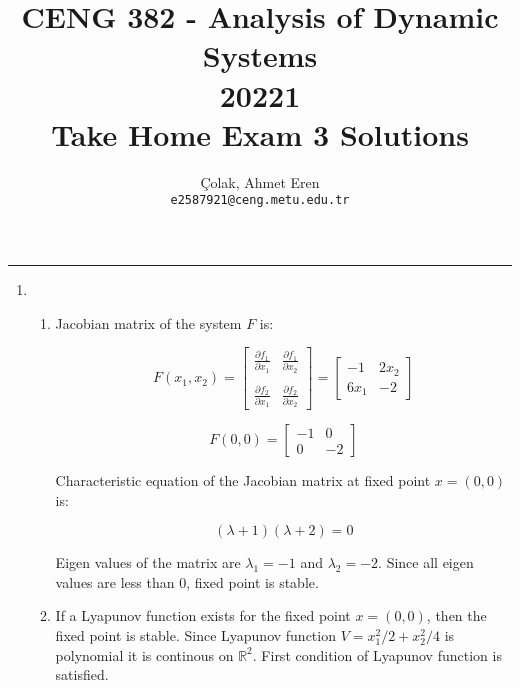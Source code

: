 \documentclass[12pt,a4paper, margin=1in]{article}
\author{
  Çolak, Ahmet Eren\\
  \texttt{e2587921@ceng.metu.edu.tr}
}
\title{CENG 382 - Analysis of Dynamic Systems \\
20221\\
Take Home Exam 3 Solutions}
\begin{document}
\maketitle

\noindent\rule{19cm}{1.2pt}
\newcommand\ddfrac[2]{\frac{\displaystyle #1}{\displaystyle #2}}

\begin{enumerate}

    \item %
        \begin{enumerate}
            \item 
            Jacobian matrix of the system $F$ is:

            \begin{equation*}
                F(x_1, x_2) = \begin{bmatrix}
                    \ddfrac{\partial f_1}{\partial x_1} & \ddfrac{\partial f_1}{\partial x_2} \\ \\
                    \ddfrac{\partial f_2}{\partial x_1} & \ddfrac{\partial f_2}{\partial x_2} 
                \end{bmatrix} = \begin{bmatrix}
                    -1 & 2x_2 \\
                    6x_1 & -2
                \end{bmatrix}
            \end{equation*}

            \begin{equation*}
                F(0,0) = \begin{bmatrix}
                    -1 & 0 \\
                    0 & -2
                \end{bmatrix}
            \end{equation*}

            Characteristic equation of the Jacobian matrix at fixed point $x = (0,0)$ is:

            \begin{equation*}
                (\lambda + 1)(\lambda+2) = 0
            \end{equation*}

            Eigen values of the matrix are $\lambda_1 = -1$ and $\lambda_2 = -2$. Since all eigen values
            are less than $0$, fixed point is stable.
            \item 
            If a Lyapunov function exists for the fixed point $x=(0,0)$, then the fixed point is stable.
            Since Lyapunov function $V = x_1^2/2 + x_2^2/4$ is polynomial it is continous on $\mathbb{R}^2$.
            First condition of Lyapunov function is satisfied.\newline


\end{enumerate}
\end{enumerate}
\end{document}

